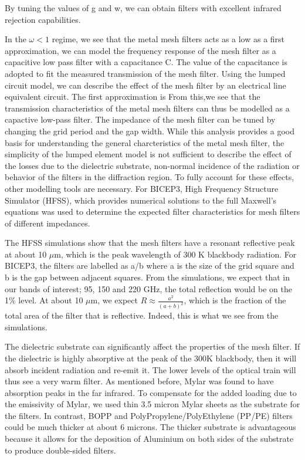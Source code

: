 \documentclass[12pt]{article}
\begin{document}
By tuning the values of g and w, we can obtain filters with excellent infrared rejection capabilities.  

In the $\omega < 1$ regime, we see that the metal mesh filters acts as a low as a first approximation, we can model the frequency response of the mesh filter as a capacitive low pass filter with a capacitance C. The value of the capacitance is adopted to fit the measured transmission of the mesh filter. Using the lumped circuit model, we can describe the effect of the mesh filter by an electrical line equivalent circuit. The first approximation is
From this,we see that the transmission characteristics of the metal mesh filters can thus be modelled as a capactive low-pass filter. The impedance of the mesh filter can be tuned by changing the grid period and the gap width. While this analysis provides a good basis for understanding the general charcteristics of the metal mesh filter, the simplicity of the lumped element model is not sufficient to describe the effect of the losses due to the dielectric substrate, non-normal incidence of the radiation or behavior of the filters in the diffraction region. To fully account for these effects, other modelling tools are necessary. For BICEP3, High Frequency Structure Simulator (HFSS), which provides numerical solutions to the full Maxwell's equations was used to determine the expected filter characteristics for mesh filters of different impedances.       

The HFSS simulations show that the mesh filters have a resonant reflective peak at about 10 $\mu$m, which is the peak wavelength of 300 K blackbody radiation. For BICEP3, the filters are labelled as a/b where a is the size of the grid square and b is the gap between adjacent squares. From the simulations, we expect that in our bands of interest; 95, 150 and 220 GHz, the total reflection would be on the 1\% level. At about 10 $\mu$m, we expect $R \approx \frac{a^2}{(a + b)^2}$, which is the fraction of the total area of the filter that is reflective. Indeed, this is what we see from the simulations.

The dielectric substrate can significantly affect the properties of the mesh filter. If the dielectric is highly absorptive at the peak of the 300K blackbody, then it will absorb incident radiation and re-emit it. The lower levels of the optical train will thus see a very warm filter. As mentioned before, Mylar was found to have absorption peaks in the far infrared. To compensate for the added loading due to the emissivity of Mylar, we used thin 3.5 micron Mylar sheets as the substrate for the filters. In contrast, BOPP and PolyPropylene/PolyEthylene (PP/PE) filters could be much thicker at about 6 microns. The thicker substrate is advantageous because it allows for the deposition of Aluminium on both sides of the substrate to produce double-sided filters. 
\end{document}
